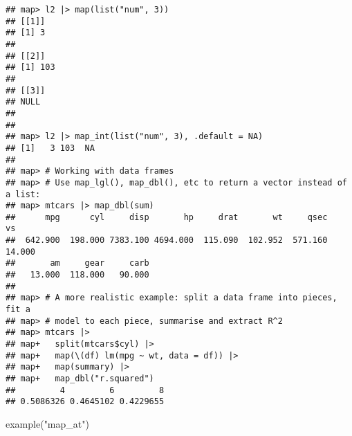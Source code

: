 \documentclass[
]{book}
\newenvironment{Shaded}{\begin{snugshade}}{\end{snugshade}}
\newcommand{\FunctionTok}[1]{\textcolor[rgb]{0.00,0.00,0.00}{#1}}
\newcommand{\NormalTok}[1]{#1}
\newcommand{\StringTok}[1]{\textcolor[rgb]{0.31,0.60,0.02}{#1}}
\begin{document}
\begin{verbatim}
## map> l2 |> map(list("num", 3))
## [[1]]
## [1] 3
## 
## [[2]]
## [1] 103
## 
## [[3]]
## NULL
## 
## 
## map> l2 |> map_int(list("num", 3), .default = NA)
## [1]   3 103  NA
## 
## map> # Working with data frames
## map> # Use map_lgl(), map_dbl(), etc to return a vector instead of a list:
## map> mtcars |> map_dbl(sum)
##      mpg      cyl     disp       hp     drat       wt     qsec       vs 
##  642.900  198.000 7383.100 4694.000  115.090  102.952  571.160   14.000 
##       am     gear     carb 
##   13.000  118.000   90.000 
## 
## map> # A more realistic example: split a data frame into pieces, fit a
## map> # model to each piece, summarise and extract R^2
## map> mtcars |>
## map+   split(mtcars$cyl) |>
## map+   map(\(df) lm(mpg ~ wt, data = df)) |>
## map+   map(summary) |>
## map+   map_dbl("r.squared")
##         4         6         8 
## 0.5086326 0.4645102 0.4229655
\end{verbatim}

\begin{Shaded}
\begin{Highlighting}[]
\FunctionTok{example}\NormalTok{(}\StringTok{"map\_at"}\NormalTok{)}
\end{Highlighting}
\end{Shaded}
\end{document}
